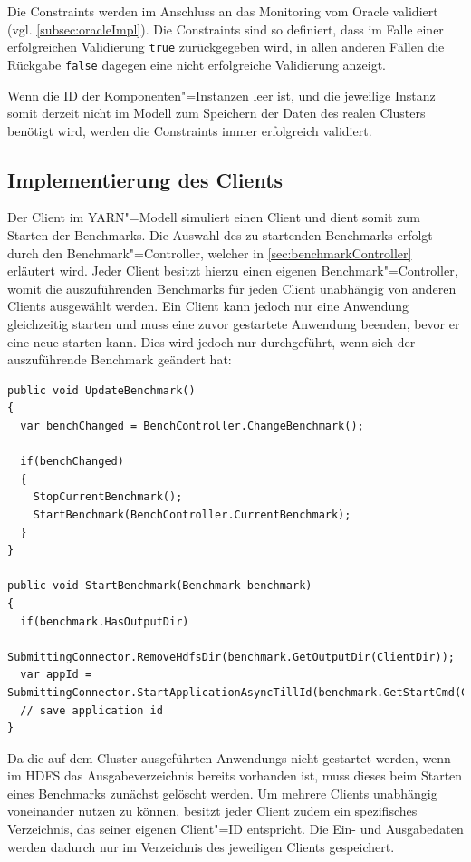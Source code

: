 Die Constraints werden im Anschluss an das Monitoring vom Oracle validiert (vgl. \cref{subsec:oracleImpl}).
Die Constraints sind so definiert, dass im Falle einer erfolgreichen Validierung \texttt{true} zurückgegeben wird, in allen anderen Fällen die Rückgabe \texttt{false} dagegen eine nicht erfolgreiche Validierung anzeigt.

Wenn die ID der Komponenten"=Instanzen leer ist, und die jeweilige Instanz somit derzeit nicht im Modell zum Speichern der Daten des realen Clusters benötigt wird, werden die Constraints immer erfolgreich validiert.

\subsection{Implementierung des Clients}
\label{subsec:yarnClient}

Der Client im \gls{YARN}"=Modell simuliert einen Client und dient somit zum Starten der Benchmarks.
Die Auswahl des zu startenden Benchmarks erfolgt durch den Benchmark"=Controller, welcher in \cref{sec:benchmarkController} erläutert wird.
Jeder Client besitzt hierzu einen eigenen Benchmark"=Controller, womit die auszuführenden Benchmarks für jeden Client unabhängig von anderen Clients ausgewählt werden.
Ein Client kann jedoch nur eine \gls{Anwendung} gleichzeitig starten und muss eine zuvor gestartete \gls{Anwendung} beenden, bevor er eine neue starten kann.
Dies wird jedoch nur durchgeführt, wenn sich der auszuführende Benchmark geändert hat:

\begin{lstlisting}[label=lst:startClientBenchmark,style=cs,
caption={[Auswahl und Start des nachfolgenden Benchmarks]
    Auswahl und Start des nachfolgenden Benchmarks (gekürzt).
    Die Methode \texttt{ChangeBenchmark()} des Benchmark"=Controllers wird in \cref{subsec:selectionNextBenchmark} erläutert.}]
public void UpdateBenchmark()
{
  var benchChanged = BenchController.ChangeBenchmark();
  
  if(benchChanged)
  {
    StopCurrentBenchmark();
    StartBenchmark(BenchController.CurrentBenchmark);
  }
}

public void StartBenchmark(Benchmark benchmark)
{
  if(benchmark.HasOutputDir)
    SubmittingConnector.RemoveHdfsDir(benchmark.GetOutputDir(ClientDir));
  var appId = SubmittingConnector.StartApplicationAsyncTillId(benchmark.GetStartCmd(ClientDir));
  // save application id
}
\end{lstlisting}

Da die auf dem Cluster ausgeführten \glspl{Anwendung} \uU nicht gestartet werden, wenn im \gls{HDFS} das Ausgabeverzeichnis bereits vorhanden ist, muss dieses beim Starten eines Benchmarks zunächst gelöscht werden.
Um mehrere Clients unabhängig voneinander nutzen zu können, besitzt jeder Client zudem ein spezifisches Verzeichnis, das seiner eigenen Client"=ID entspricht.
Die Ein- und Ausgabedaten werden dadurch nur im Verzeichnis des jeweiligen Clients gespeichert.


